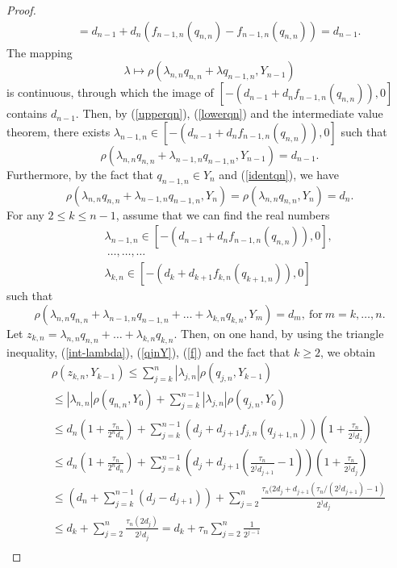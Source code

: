 \documentclass[10pt,a4paper]{amsart}
\begin{document}
\begin{proof}
\begin{eqnarray}
&&=d_{n-1}+d_n\left(f_{n-1,n}(q_{n,n})-f_{n-1,n}(q_{n,n})\right)= d_{n-1}.
\end{eqnarray}
The mapping
$$
\lambda\longmapsto\rho(\lambda_{n,n}q_{n,n}+\lambda q_{n-1,n},Y_{n-1})
$$
 is continuous, through which the image of $[-(d_{n-1}+d_nf_{n-1,n}(q_{n,n})),0]$ contains $d_{n-1}$. Then,  by (\ref{upperqn}), (\ref{lowerqn}) and the intermediate value theorem, there exists $\lambda_{n-1,n}\in [-(d_{n-1}+d_nf_{n-1,n}(q_{n,n})),0]$ such that
\begin{equation}
\label{rhodn}
\rho(\lambda_{n,n}q_{n,n}+\lambda_{n-1,n}q_{n-1,n},Y_{n-1})= d_{n-1}.
\end{equation}
Furthermore, by the fact that $q_{n-1,n}\in Y_n$ and (\ref{identqn}), we have
$$
\rho(\lambda_{n,n}q_{n,n}+\lambda_{n-1,n}q_{n-1,n},Y_{n})= \rho(\lambda_{n,n}q_{n,n},Y_{n})= d_{n}.
$$
For any $2\le k\le n-1$, assume that we can find the real numbers
\begin{eqnarray}
\label{int-lambda}
&&\lambda_{n-1,n}\in[-(d_{n-1}+d_{n}f_{n-1,n}(q_{n,n})),0],\nonumber\\
&&~\ldots,\ldots,\ldots~\nonumber\\
&&\lambda_{k,n}\in[-(d_{k}+d_{k+1}f_{k,n}(q_{k+1,n})),0]
\end{eqnarray}
such that
$$
\rho(\lambda_{n,n}q_{n,n}+\lambda_{n-1,n}q_{n-1,n}+\ldots+\lambda_{k,n}q_{k,n},Y_m)=d_m,~\mbox{for}~m=k,\ldots,n.
$$
Let $
z_{k,n}=\lambda_{n,n}q_{n,n}+\ldots+\lambda_{k,n}q_{k,n}$.
Then, on one hand, by using the triangle inequality, (\ref{int-lambda}), (\ref{qjnY}), (\ref{f}) and  the fact that $k\ge2$, we obtain
\begin{eqnarray}
\label{zY}
&&\rho(z_{k,n},Y_{k-1})\le\sum_{j=k}^n|\lambda_{j,n}|\rho(q_{j,n},Y_{k-1})\nonumber\\
&&\le|\lambda_{n,n}|\rho(q_{n,n},Y_{0})+\sum_{j=k}^{n-1}|\lambda_{j,n}|\rho(q_{j,n},Y_{0})\nonumber\\
&&\le d_n\left(1+\frac{\tau_{n}}{2^nd_n}\right)+\sum_{j=k}^{n-1}\left(d_{j}+d_{j+1}f_{j,n}(q_{j+1,n})\right)\left(1+\frac{\tau_{n}}{2^jd_j}\right)\nonumber\\
&&\le d_n\left(1+\frac{\tau_{n}}{2^nd_n}\right)+\sum_{j=k}^{n-1}\left(d_{j}+d_{j+1}\left(\frac{\tau_n}{2^{j}d_{j+1}}-1\right)\right)\left(1+\frac{\tau_{n}}{2^jd_j}\right)\nonumber\\
&&\le \left(d_n+\sum_{j=k}^{n-1}(d_{j}-d_{j+1})\right)+\sum_{j=2}^{n}\frac{\tau_n(2d_j+d_{j+1}(\tau_n/(2^{j}d_{j+1})-1)}{2^jd_j}\nonumber\\
&&\le d_k+\sum_{j=2}^{n}\frac{\tau_n(2d_j)}{2^{j}d_j}= d_k+\tau_n\sum_{j=2}^n\frac{1}{2^{j-1}}\nonumber\\

\end{eqnarray}
\end{proof}
\end{document}
